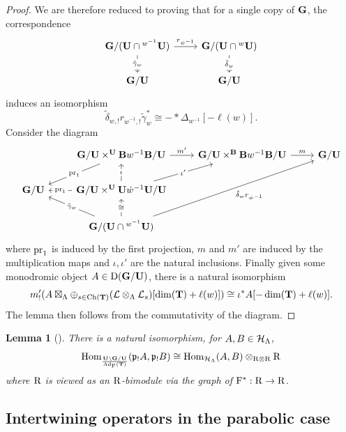 \documentclass[article, 10pt, oneside, reqno]{amsart}
\theoremstyle{plain}
\newtheorem{lem}[thm]{Lemma}
\theoremstyle{definition}
\theoremstyle{remark}
\begin{document}
\begin{proof}
We are therefore reduced to proving that for a single copy of $\mathbf{G}$, the correspondence 
\[\begin{tikzcd}
	{\Gbf/ (\Ubf \cap {^{w^{-1}}\Ubf})} & {\Gbf/(\Ubf \cap {^{w}\Ubf})} \\
	{\Gbf/\Ubf} & { \Gbf/\Ubf}
	\arrow["{r_{\dot{w}^{-1}}}", from=1-1, to=1-2]
	\arrow["{\tilde{\gamma}_w}"{description}, from=1-1, to=2-1]
	\arrow["{\tilde{\delta}_w}"{description}, from=1-2, to=2-2]
\end{tikzcd}\]
induces an isomorphism 
$$\tilde{\delta}_{w,!}r_{\dot{w}^{-1},!}\tilde{\gamma}_w^* \cong - * \Delta_{w^{-1}}[-\ell(w)].$$
Consider the diagram 
\[\begin{tikzcd}
	& {\Gbf/\Ubf \times^{\Ubf} \Bbf w^{-1}\Bbf/\Ubf} & {\Gbf/\Ubf \times^{\Bbf} \Bbf w^{-1}\Bbf/\Ubf} & {\Gbf/\Ubf } \\
	{\Gbf/\Ubf} & {\Gbf/\Ubf \times^{\Ubf} \Ubf \dot{w}^{-1}\Ubf/\Ubf} \\
	& {\Gbf / (\Ubf \cap {^{w^{-1}}}\Ubf)}
	\arrow["{m'}", from=1-2, to=1-3]
	\arrow["{\pr_1}"{description}, from=1-2, to=2-1]
	\arrow["m", from=1-3, to=1-4]
	\arrow["\iota"{description}, from=2-2, to=1-2]
	\arrow["{\iota'}"{description}, from=2-2, to=1-3]
	\arrow["{\pr_1}"{description}, from=2-2, to=2-1]
	\arrow["{\tilde{\delta}_w r_{\dot{w}^{-1}}}"', from=3-2, to=1-4]
	\arrow["{\tilde{\gamma}_w}"{description}, from=3-2, to=2-1]
	\arrow["\cong"{description}, from=3-2, to=2-2]
\end{tikzcd}\]
where $\mathrm{pr}_1$ is induced by the first projection, $m$ and $m'$ are induced by the multiplication maps and $\iota, \iota'$ are the natural inclusions.
Finally given some monodromic object $A \in \mathrm{D}(\mathbf{G}/\mathbf{U})$, there is a natural isomorphism 
$$m'_!(A \boxtimes_{\Lambda} \oplus_{s \in \mathrm{Ch}(\mathbf{T})} (\mathcal{L} \otimes_{\Lambda} \mathcal{L}_s)[\dim(\mathbf{T}) + \ell(w)]) \cong  \iota^* A[-\dim(\mathbf{T}) + \ell(w)].$$
The lemma then follows from the commutativity of the diagram. 
\end{proof}

\begin{lem}[]\label{lem:reduction-from-h-to-o}
There is a natural isomorphism, for $A,B \in \mathcal{H}_{\Lambda}$, 
$$\mathrm{Hom}_{\frac{\mathbf{U} \backslash \mathbf{G} /\mathbf{U}}{\mathrm{Ad}_{\mathrm{F}}(\mathbf{T})}}(\mathfrak{p}_!A, \mathfrak{p}_!B) \cong \mathrm{Hom}_{\mathcal{H}_{\Lambda}}(A, B) \otimes_{\mathrm{R} \otimes \mathrm{R}} \mathrm{R}$$ 
where $\mathrm{R}$ is viewed as an $\mathrm{R}$-bimodule via the graph of $\mathrm{F}^* : \mathrm{R} \to \mathrm{R}$.
\end{lem}

\subsection{Intertwining operators in the parabolic case}
\end{document}
